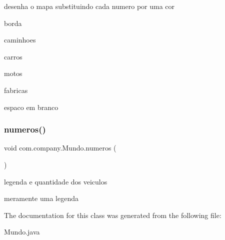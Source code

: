 desenha o mapa substituindo cada numero por uma cor 

borda

caminhoes

carros

motos

fabricas

espaco em branco \mbox{\label{classcom_1_1company_1_1_mundo_afd89839275a49ac20884b5e402ae374a}} 
\subsubsection{\texorpdfstring{numeros()}{numeros()}}
{\footnotesize\ttfamily void com.\+company.\+Mundo.\+numeros (\begin{DoxyParamCaption}{ }\end{DoxyParamCaption})\hspace{0.3cm}{\ttfamily [inline]}}



legenda e quantidade dos veiculos 

meramente uma legenda 

The documentation for this class was generated from the following file\+:\begin{DoxyCompactItemize}
\item 
Mundo.\+java\end{DoxyCompactItemize}
